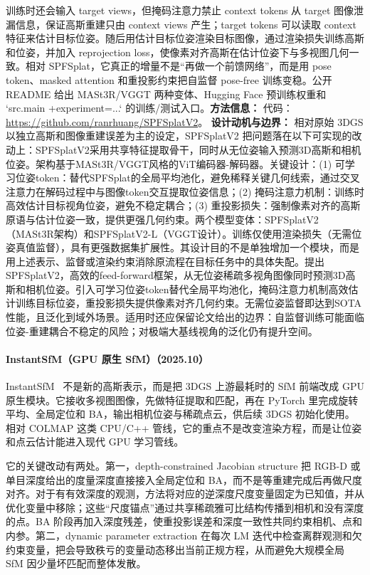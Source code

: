 训练时还会输入 target views，但掩码注意力禁止 context tokens 从 target 图像泄漏信息，保证高斯重建只由 context views 产生；target tokens 可以读取 context 特征来估计目标位姿。随后用估计目标位姿渲染目标图像，通过渲染损失训练高斯和位姿，并加入 reprojection loss，使像素对齐高斯在估计位姿下与多视图几何一致。相对 SPFSplat，它真正的增量不是“再做一个前馈网络”，而是用 pose token、masked attention 和重投影约束把自监督 pose-free 训练变稳。公开 README 给出 MASt3R/VGGT 两种变体、Hugging Face 预训练权重和 `src.main +experiment=...` 的训练/测试入口。\textbf{方法信息：} 代码：\url{https://github.com/ranrhuang/SPFSplatV2}。
\textbf{设计动机与边界：} 相对原始 3DGS 以独立高斯和图像重建误差为主的设定，SPFSplatV2 把问题落在以下可实现的改动上：SPFSplatV2采用共享特征提取骨干，同时从无位姿输入预测3D高斯和相机位姿。架构基于MASt3R/VGGT风格的ViT编码器-解码器。关键设计：(1) 可学习位姿token：替代SPFSplat的全局平均池化，避免稀释关键几何线索，通过交叉注意力在解码过程中与图像token交互提取位姿信息；(2) 掩码注意力机制：训练时高效估计目标视角位姿，避免不稳定耦合；(3) 重投影损失：强制像素对齐的高斯原语与估计位姿一致，提供更强几何约束。两个模型变体：SPFSplatV2（MASt3R架构）和SPFSplatV2-L（VGGT设计）。训练仅使用渲染损失（无需位姿真值监督），具有更强数据集扩展性。其设计目的不是单独增加一个模块，而是用上述表示、监督或渲染约束消除原流程在目标任务中的具体失配。提出SPFSplatV2，高效的feed-forward框架，从无位姿稀疏多视角图像同时预测3D高斯和相机位姿。引入可学习位姿token替代全局平均池化，掩码注意力机制高效估计训练目标位姿，重投影损失提供像素对齐几何约束。无需位姿监督即达到SOTA性能，且泛化到域外场景。适用时还应保留论文给出的边界：自监督训练可能面临位姿-重建耦合不稳定的风险；对极端大基线视角的泛化仍有提升空间。
\paragraph{InstantSfM（GPU 原生 SfM）（2025.10）}
InstantSfM~\cite{2510_13310} 不是新的高斯表示，而是把 3DGS 上游最耗时的 SfM 前端改成 GPU 原生模块。它接收多视图图像，先做特征提取和匹配，再在 PyTorch 里完成旋转平均、全局定位和 BA，输出相机位姿与稀疏点云，供后续 3DGS 初始化使用。相对 COLMAP 这类 CPU/C++ 管线，它的重点不是改变渲染方程，而是让位姿和点云估计能进入现代 GPU 学习管线。

它的关键改动有两处。第一，depth-constrained Jacobian structure 把 RGB-D 或单目深度给出的度量深度直接接入全局定位和 BA，而不是等重建完成后再做尺度对齐。对于有有效深度的观测，方法将对应的逆深度尺度变量固定为已知值，并从优化变量中移除；这些“尺度锚点”通过共享稀疏雅可比结构传播到相机和没有深度的点。BA 阶段再加入深度残差，使重投影误差和深度一致性共同约束相机、点和内参。第二，dynamic parameter extraction 在每次 LM 迭代中检查离群观测和欠约束变量，把会导致秩亏的变量动态移出当前正规方程，从而避免大规模全局 SfM 因少量坏匹配而整体发散。

